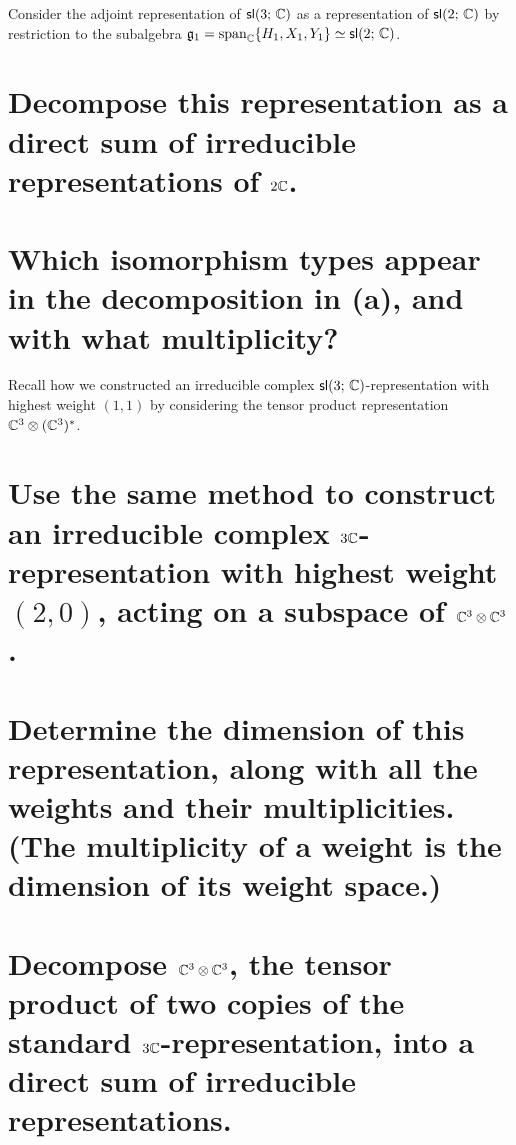 \documentclass[
	pages,
	boxes,
	color=WildStrawberry
]{homework}
\begin{document}
\begin{problem}
Consider the adjoint representation of $\mathsf{sl}(3;\, \mathbb{C})$ as a representation of $\mathsf{sl}(2;\, \mathbb{C})$ by restriction to the subalgebra $\mathfrak{g}_1 = \operatorname{span}_{\mathbb{C}}\{H_1, X_1, Y_1\} \simeq \mathsf{sl}(2;\, \mathbb{C})$.
\begin{parts}
	\part{Decompose this representation as a direct sum of irreducible representations of $\sl{2}{\mathbb{C}}$.}\label{part:1a}
	\part{Which isomorphism types appear in the decomposition in (a), and with what multiplicity?}\label{part:1b}
\end{parts}
\end{problem}

\begin{problem}
Recall how we constructed an irreducible complex $\mathsf{sl}(3;\, \mathbb{C})$-representation with highest weight $(1, 1)$ by considering the tensor product representation $\mathbb{C}^3 \otimes (\mathbb{C}^3)^*$.
\begin{parts}
	\part{Use the same method to construct an irreducible complex $\sl{3}{\mathbb{C}}$-representation with highest weight $(2, 0)$, acting on a subspace of $\mathbb{C}^3 \otimes \mathbb{C}^3$.}\label{part:2a}
	\part{Determine the dimension of this representation, along with all the weights and their multiplicities. (The multiplicity of a weight is the dimension of its weight space.)}\label{part:2b}
	\part{Decompose $\mathbb{C}^3 \otimes \mathbb{C}^3$, the tensor product of two copies of the standard $\sl{3}{\mathbb{C}}$-representation, into a direct sum of irreducible representations.}\label{part:2c}
\end{parts}
\end{problem}
\end{document}
